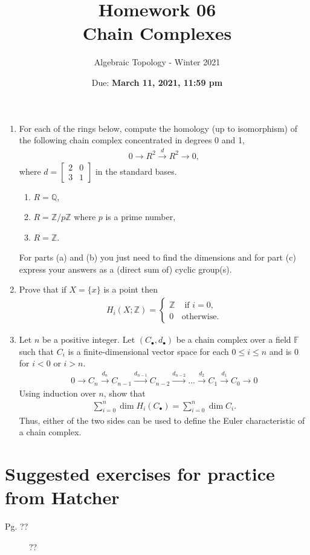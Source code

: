 \documentclass{article}
\title{Homework 06 \\ Chain Complexes}
\author{Algebraic Topology - Winter 2021}
\date{Due: \textbf{March 11, 2021, 11:59 pm}}
\begin{document}
\maketitle

\begin{enumerate}
    \item For each of the rings below, compute the homology (up to isomorphism) of the following chain complex concentrated in degrees 0 and 1,
    \begin{align*}
        0 \to R^2 \overset{d}{\longrightarrow} R^2 \to 0,
    \end{align*}
    where $d = \begin{bmatrix} 2 & 0 \\ 3 & 1\end{bmatrix}$ in the standard bases.
    \begin{enumerate}
        \item $ R = \mathbb{Q}$,
        \item $ R = \mathbb{Z}/p \mathbb{Z}$ where $p$ is a prime number,
        \item $ R = \mathbb{Z}$.
    \end{enumerate}
    For parts (a) and (b) you just need to find the dimensions and for part (c) express your answers as a (direct sum of) cyclic group(s).
    \item Prove that if $X = \{x\}$ is a point then 
    \begin{align*}
        H_i(X; \mathbb{Z}) = 
        \begin{cases}
        \mathbb{Z} & \mbox{ if } i = 0, \\
        0 & \mbox{otherwise.}
        \end{cases}
    \end{align*}
    
        \item Let $n$ be a positive integer. Let $(C_\bullet, d_\bullet)$ be a chain complex over a field $\mathbb{F}$ such that $C_i$ is a finite-dimensional vector space for each $ 0 \le i \le n$ and is 0 for $ i < 0$ or $i > n$. 
    \begin{align*}
        0 \to C_n \overset{d_n}{\longrightarrow} C_{n-1}
        \overset{d_{n-1}}{\longrightarrow} C_{n-2}
        \overset{d_{n-2}}{\longrightarrow} 
        \dots
        \overset{d_{2}}{\longrightarrow} C_1
        \overset{d_{1}}{\longrightarrow} C_0
        \to 0
    \end{align*}
    Using induction over $n$, show that 
    \begin{align*}
        \sum \limits_{i=0}^n \dim H_i (C_\bullet) =        
        \sum \limits_{i=0}^n \dim C_i.
    \end{align*}
    Thus, either of the two sides can be used to define the Euler characteristic of a chain complex.
    
\end{enumerate}

\newpage
\section*{Suggested exercises for practice from Hatcher}

\begin{description}
\item[Pg. ??] ??
\end{description}
\end{document}
